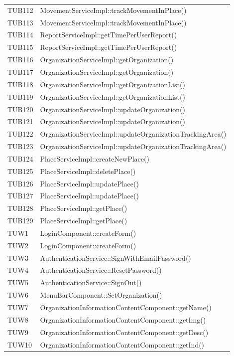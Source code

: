 {\begin{longtable}{C{2cm} C{12cm}}
		TUB112 & MovementServiceImpl::trackMovementInPlace()\\
		TUB113 & MovementServiceImpl::trackMovementInPlace()\\
		TUB114 & ReportServiceImpl::getTimePerUserReport()\\
		TUB115 & ReportServiceImpl::getTimePerUserReport()\\
		TUB116 & OrganizationServiceImpl::getOrganization()\\
		TUB117 & OrganizationServiceImpl::getOrganization()\\
		TUB118 & OrganizationServiceImpl::getOrganizationList()\\
		TUB119 & OrganizationServiceImpl::getOrganizationList()\\
		TUB120 & OrganizationServiceImpl::updateOrganization()\\
		TUB121 & OrganizationServiceImpl::updateOrganization()\\
		TUB122 & OrganizationServiceImpl::updateOrganizationTrackingArea()\\
		TUB123 & OrganizationServiceImpl::updateOrganizationTrackingArea()\\
		TUB124 & PlaceServiceImpl::createNewPlace()\\
		TUB125 & PlaceServiceImpl::deletePlace()\\
		TUB126 & PlaceServiceImpl::updatePlace()\\
		TUB127 & PlaceServiceImpl::updatePlace()\\
		TUB128 & PlaceServiceImpl::getPlace()\\
		TUB129 & PlaceServiceImpl::getPlace()\\
		TUW1 & LoginComponent::createForm() \\
		TUW2 & LoginComponent::createForm() \\
		TUW3 & AuthenticationService::SignWithEmailPassword() \\
		TUW4 & AuthenticationService::ResetPassword() \\
		TUW5 & AuthenticationService::SignOut() \\
		TUW6 & MenuBarComponent::SetOrganization() \\
		TUW7 & OrganizationInformationContentComponent::getName() \\
		TUW8 & OrganizationInformationContentComponent::getImg() \\
		TUW9 & OrganizationInformationContentComponent::getDesc() \\
		TUW10 & OrganizationInformationContentComponent::getInd() \\

\end{longtable}}
